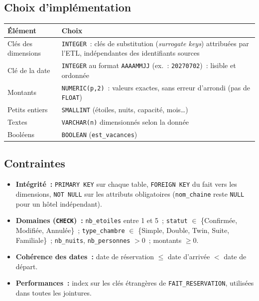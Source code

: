 \subsection*{Choix d'implémentation}
{}

\begin{center}
\small
\begin{tabularx}{\linewidth}{l X}
	\toprule
	\textbf{Élément} & \textbf{Choix} \\
	\midrule
	Clés des dimensions & \texttt{INTEGER}~: clés de substitution (\textit{surrogate keys}) attribuées par l'ETL, indépendantes des identifiants sources \\
	Clé de la date & \texttt{INTEGER} au format \texttt{AAAAMMJJ} (ex.~: \texttt{20270702})~: lisible et ordonnée \\
	Montants & \texttt{NUMERIC(p,2)}~: valeurs exactes, sans erreur d'arrondi (pas de \texttt{FLOAT}) \\
	Petits entiers & \texttt{SMALLINT} (étoiles, nuits, capacité, mois\dots) \\
	Textes & \texttt{VARCHAR(n)} dimensionnés selon la donnée \\
	Booléens & \texttt{BOOLEAN} (\texttt{est\_vacances}) \\
	\bottomrule
\end{tabularx}
\end{center}

\subsection*{Contraintes}
{}

\begin{itemize}
	\item \textbf{Intégrité~:} \texttt{PRIMARY KEY} sur chaque table, \texttt{FOREIGN KEY} du fait vers les dimensions, \texttt{NOT NULL} sur les attributs obligatoires (\texttt{nom\_chaine} reste \texttt{NULL} pour un hôtel indépendant).
	\item \textbf{Domaines (\texttt{CHECK})~:} \texttt{nb\_etoiles} entre 1 et 5~; \texttt{statut} $\in$ \{Confirmée, Modifiée, Annulée\}~; \texttt{type\_chambre} $\in$ \{Simple, Double, Twin, Suite, Familiale\}~; \texttt{nb\_nuits}, \texttt{nb\_personnes} $> 0$~; montants $\geq 0$.
	\item \textbf{Cohérence des dates~:} date de réservation $\leq$ date d'arrivée $<$ date de départ.
	\item \textbf{Performances~:} index sur les clés étrangères de \texttt{FAIT\_RESERVATION}, utilisées dans toutes les jointures.
\end{itemize}

